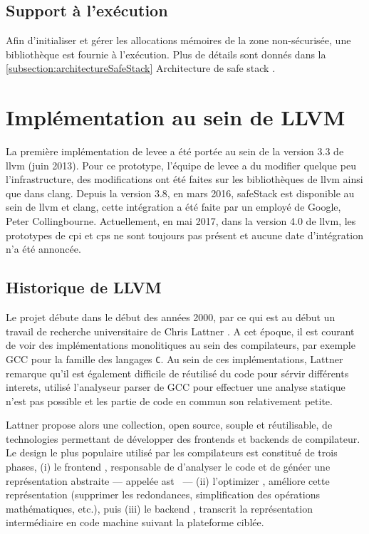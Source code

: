 \subsection{Support à l'exécution}

Afin d'initialiser et gérer les allocations mémoires de la zone non-sécurisée, une bibliothèque est fournie à l'exécution. Plus de détails sont donnés dans la \autoref{subsection:architectureSafeStack} Architecture de \og safe stack \fg.

\section{Implémentation au sein de LLVM}

%

La première implémentation de \gls{levee} a été portée au sein de la version 3.3 de \gls{llvm} (juin 2013). Pour ce prototype, l'équipe de \gls{levee} a du modifier quelque peu l'infrastructure, des modifications ont été faites sur les bibliothèques de \gls{llvm} ainsi que dans \gls{clang}. Depuis la version 3.8, en mars 2016, \gls{safeStack} est disponible au sein de \gls{llvm} et \gls{clang}, cette intégration a été faite par un employé de Google, Peter Collingbourne. Actuellement, en mai 2017, dans la version 4.0 de \gls{llvm}, les prototypes de \gls{cpi} et \gls{cps} ne sont toujours pas présent et aucune date d'intégration n'a été annoncée.

\subsection{Historique de LLVM}

Le projet débute dans le début des années 2000, par ce qui est au début un travail de recherche universitaire de Chris Lattner \cite{ChrisLattner}. A cet époque, il est courant de voir des implémentations monolitiques au sein des compilateurs, par exemple GCC pour la famille des langages \texttt{C}. Au sein de ces implémentations, Lattner remarque qu'il est également difficile de réutilisé du code pour sérvir différents interets, utilisé l'analyseur \og parser \fg de GCC pour effectuer une analyse statique n'est pas possible et les partie de code en commun son relativement petite.

Lattner propose alors une collection, open source, souple et réutilisable, de technologies permettant de développer des \og frontends \fg et \og backends \fg de compilateur. Le design le plus populaire utilisé par les compilateurs est constitué de trois phases, (i) le \og frontend \fg, responsable de d'analyser le code et de généer une représentation abstraite --- appelée \og \gls{ast} \fg \ --- (ii) l'\og optimizer \fg, améliore cette représentation (supprimer les redondances, simplification des opérations mathématiques, etc.), puis (iii) le \og backend \fg, transcrit la représentation intermédiaire en code machine suivant la plateforme ciblée.

